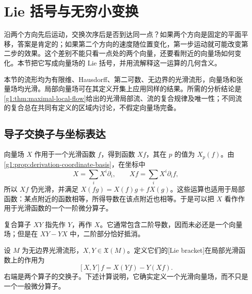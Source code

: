
% 
% 

\section{Lie 括号与无穷小变换}
\label{g1:sec:1303}

沿两个方向先后运动，交换次序后是否到达同一点？如果两个方向是固定的平面平移，答案是肯定的；如果第二个方向的速度随位置变化，第一步运动就可能改变第二步的效果。这个差别不能只看一点处的两个向量，还要看附近的向量场如何变化。本节把它写成向量场的 Lie 括号，并用流解释这一运算的几何含义。

\ProseParagraphBreak

本节的流形均为有限维、Hausdorff、第二可数、无边界的光滑流形，向量场和张量场均光滑。局部向量场可在其定义开集上应用同样的结果。所需的分析结论是\cref{g1:thm:maximal-local-flow}给出的光滑局部流、流的复合规律及唯一性；不同流的复合总在共同有定义的区域内讨论，不假定向量场完备。

\subsection{导子交换子与坐标表达}
\label{g1:subsec:1303:01}

向量场 \(X\) 作用于一个光滑函数 \(f\)，得到函数 \(Xf\)，其在 \(p\) 的值为 \(X_p(f)\)。由\cref{g1:prop:derivation-coordinate-basis}，在坐标中
\[
	X=\sum_iX^i\partial_i,\qquad Xf=\sum_iX^i\partial_i f,
\]
所以 \(Xf\) 仍光滑，并满足 \(X(fg)=X(f)g+fX(g)\)。这些运算也适用于局部函数：某点附近的函数相等，所得导数在该点附近也相等。于是可以把 \(X\) 看作作用于光滑函数的一个一阶微分算子。

\ProseParagraphBreak

复合算子 \(XY\) 指先作 \(Y\)，再作 \(X\)。它通常包含二阶导数，因而未必还是一个向量场；但是在 \(XY-YX\) 中，二阶部分恰好抵消。

\begin{definition}
	\label{g1:def:lie-bracket}
	设 \(M\) 为无边界光滑流形，\(X,Y\in\mathfrak X(M)\)。定义它们的[Lie bracket]在局部光滑函数上的作用为
	\[
		[X,Y]f=X(Yf)-Y(Xf).
	\]
	右端是两个算子的交换子。下述计算说明，它确实定义一个光滑向量场，而不只是一个一般微分算子。
\end{definition}

